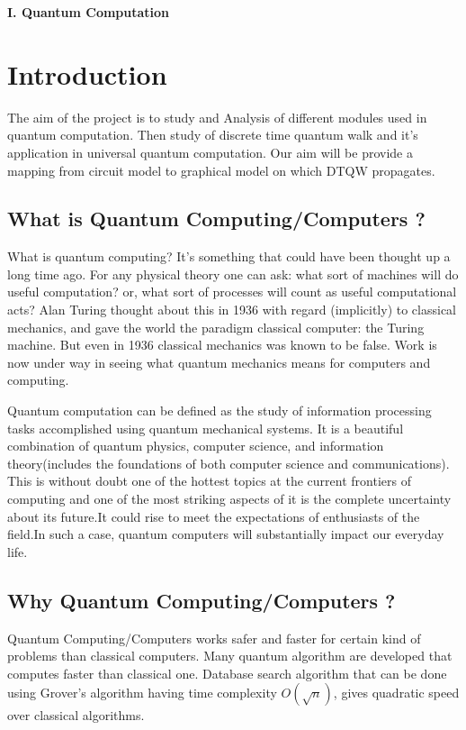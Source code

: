 \documentclass[11 pt]{article}
\theoremstyle{definition}
\theoremstyle{remark}
\begin{document}
\newpage
\begin{center}
\begin{LARGE}
\textbf{I. Quantum Computation}
\end{LARGE}
\end{center}
\thispagestyle{empty}
\section{Introduction}
The aim of the project is to study and Analysis of different modules used in quantum computation. Then study of discrete time quantum walk and it's application in universal quantum computation. Our aim will be provide a mapping from circuit model to graphical model on which DTQW propagates.     
 \\

\subsection{What is Quantum Computing/Computers ?}
What is quantum computing? It's something that could have been thought up a long time ago. For any physical theory one can ask: what sort of machines will do useful computation? or, what sort of processes will count as useful computational acts? Alan Turing thought about this in 1936 with regard (implicitly) to classical mechanics, and gave the world the paradigm classical computer: the Turing machine. But even in 1936 classical mechanics was known to be false. Work is now under way in seeing what quantum mechanics means for computers and computing.

Quantum computation can be defined as the study of information processing tasks accomplished using quantum mechanical systems. It is a beautiful combination of quantum physics, computer science, and information theory(includes the foundations of both computer science and communications). This is without doubt one of the hottest topics at the current frontiers of
computing and one of the most striking aspects of it is the complete uncertainty about its future.It could rise to meet the expectations of enthusiasts of the field.In such a case, quantum computers will substantially impact our everyday life.


\subsection{Why Quantum Computing/Computers ?}
Quantum Computing/Computers works safer and faster for certain kind of problems than classical computers. Many quantum algorithm are developed that computes faster than classical one. Database search algorithm that can be done using Grover's algorithm having time complexity $O(\sqrt{n})$, gives quadratic speed over classical algorithms.
\end{document}
